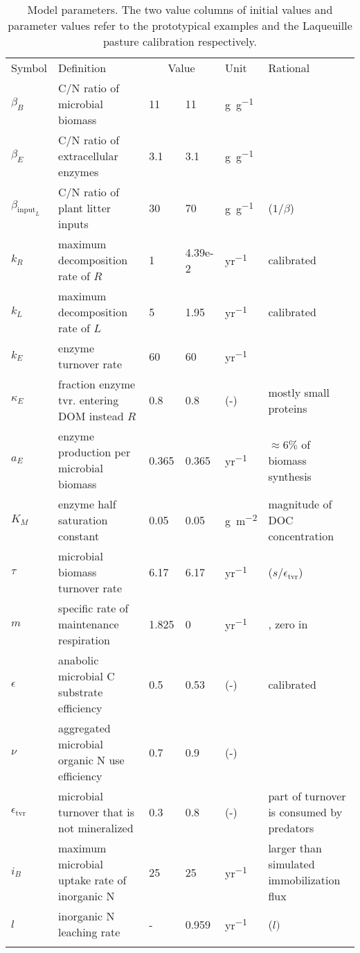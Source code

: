 \begin{table*}[t]
\caption{
\label{tab:modelParameters}
Model parameters. The two value columns of initial values and parameter values refer to the prototypical
examples and the Laqueuille pasture calibration respectively.}
\begin{tabular}{lp{4.5cm}lllp{4.5cm}}
\tophline
Symbol &  Definition & \multicolumn{2}{c}{Value} & Unit & Rational \\
\middlehline
$\beta_B$ &  C/N ratio of microbial biomass & 11 & 11& \unit{g~g^{-1}} &
\citep{Perveen14} 
\\
$\beta_E$ &  C/N ratio of extracellular enzymes & 3.1 & 3.1 &
\unit{g~g^{-1}} & \citep{Sterner02} \\
$\beta_{\mathrm{input}_L}$ &  C/N ratio of plant litter inputs & 30 & 70 &
\unit{g~g^{-1}} & \citep{Perveen14} ($1/\beta$) \\
$k_R$ &  maximum decomposition rate of $R$ & 1 & 4.39e-2 & \unit{yr^{-1}}
& calibrated \\
$k_L$ &  maximum decomposition rate of $L$ & 5 & 1.95 & \unit{yr^{-1}}
& calibrated \\
$k_E$ &  enzyme turnover rate &  60  & 60 & \unit{yr^{-1}} & \citep{Burns13} \\
$\kappa_E$ & fraction enzyme tvr. entering DOM instead $R$ & 
0.8 & 0.8 & (-) & mostly small proteins \\
$a_{E}$ &  enzyme production per microbial biomass & 0.365 & 0.365 &
\unit{yr^{-1}} & $\approx 6\%$ of biomass synthesis \\ 
$K_{M}$ &  enzyme half saturation constant & 0.05 & 0.05 &
\unit{g~m^{-2}} & magnitude of DOC concentration \\
$\tau$ &  microbial biomass turnover rate & 6.17 & 6.17 & \unit{yr^{-1}} &
\citep{Perveen14} ($s/\epsilon_{\operatorname{tvr}}$) \\
$m$ & specific rate of maintenance respiration & 1.825 & 0 & 
\unit{yr^{-1}} & \citep{Bodegom07}, zero in \citep{Perveen14} \\
$\epsilon$ & anabolic microbial C substrate efficiency & 0.5 & 0.53 &
(-) & calibrated \\ %
$\nu$ & aggregated microbial organic N use efficiency & 0.7 &
0.9 & (-) & \citep{Manzoni08} \\
$\epsilon_{\operatorname{tvr}}$ & microbial turnover that is not
mineralized & 0.3 & 0.8 & (-) & part of turnover is consumed by
predators
\\
$i_{B}$ & maximum microbial uptake rate of inorganic N & 25 & 25 &
\unit{yr^{-1}} & larger than simulated immobilization flux \\
$l$ & inorganic N leaching rate & - & 0.959 &
\unit{yr^{-1}} & \citep{Perveen14} ($l)$ \\
\bottomhline
\end{tabular}
\end{table*}

